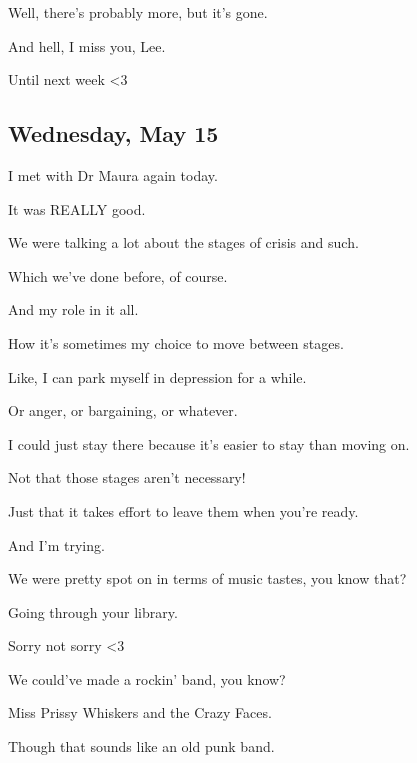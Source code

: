 {
Well, there's probably more, but
it's gone.

And hell, I miss you, Lee.

Until next week \textless{}3

\newpage

\subsection*{Wednesday, May 15}\label{wednesday-may-15}

I met with Dr Maura again today.

It was REALLY good.

We were talking a lot about the
stages of crisis and such.

Which we've done before, of course.

And my role in it all.

How it's sometimes my choice to move
between stages.

Like, I can park myself in
depression for a while.

Or anger, or bargaining, or
whatever.

I could just stay there because it's
easier to stay than moving on.

Not that those stages aren't
necessary!

Just that it takes effort to leave
them when you're ready.

And I'm trying.

We were pretty spot on in terms of
music tastes, you know that?

Going through your library.

Sorry not sorry \textless{}3

We could've made a rockin' band, you
know?

Miss Prissy Whiskers and the Crazy
Faces.

Though that sounds like an old punk
band.

}
